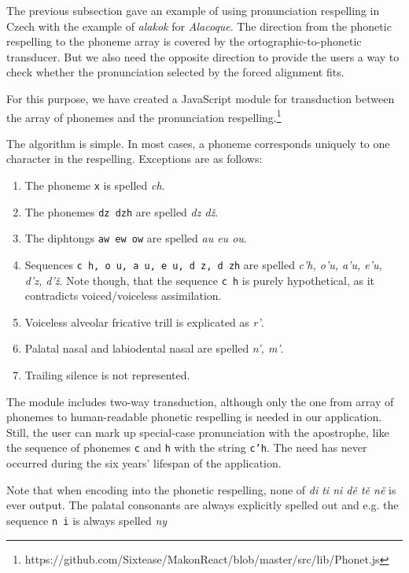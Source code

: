 \documentclass{itatnew}
\begin{document}
The previous subsection gave an example of using pronunciation respelling in
Czech with the example of {\em alakok} for {\em Alacoque}. The direction from
the phonetic respelling to the phoneme array is covered by the
ortographic-to-phonetic transducer. But we also need the opposite direction to
provide the users a way to check whether the pronunciation selected by the
forced alignment fits.

For this purpose, we have created a JavaScript module for transduction between
the array of phonemes and the pronunciation
respelling.\footnote{https://github.com/Sixtease/MakonReact/\allowbreak{}blob/master/src/lib/Phonet.js}

The algorithm is simple. In most cases, a phoneme corresponds uniquely to one
character in the respelling. Exceptions are as follows:
\begin{enumerate}
\item{The phoneme \texttt{x} is spelled {\em ch}.}
\item{The phonemes \texttt{dz dzh} are spelled {\em dz dž}.}
\item{The diphtongs \texttt{aw ew ow} are spelled {\em au eu ou}.}
\item{
    Sequences \texttt{c h, o u, a u, e u, d z, d zh} are
    spelled {\em c'h, o'u, a'u, e'u, d'z, d'ž}. Note
    though, that the sequence \texttt{c h} is purely hypothetical, as it
    contradicts voiced/voiceless assimilation.
}
\item{
    Voiceless alveolar fricative trill is explicated as {\em r'}.
}
\item{
    Palatal nasal and labiodental nasal are spelled {\em n', m'}.
}
\item{Trailing silence is not represented.}
\end{enumerate}

The module includes two-way transduction, although only the one from array of
phonemes to human-readable phonetic respelling is needed in our application.
Still, the user can mark up special-case pronunciation with the apostrophe, like
the sequence of phonemes \texttt{c} and \texttt{h} with the string \texttt{c'h}.
The need has never occurred during the six years' lifespan of the application.

Note that when encoding into the phonetic respelling, none of
{\em di ti ni dě tě ně} is ever output. The palatal consonants are always
explicitly spelled out and e.g. the sequence \texttt{n i} is always spelled
{\em ny}
\end{document}
